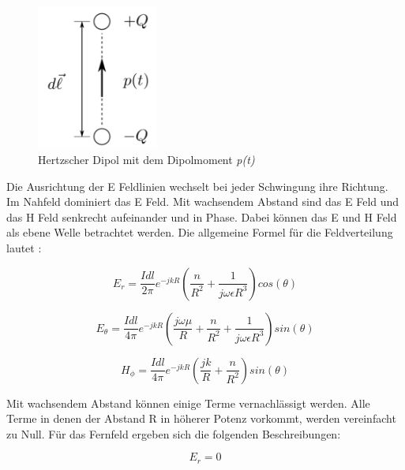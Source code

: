 \begin{figure}[!htb]
	\centering
	\includegraphics[width=4cm]{content/bilder/HerzDipolEMANTS37.pdf}%
	\caption{Hertzscher Dipol mit dem Dipolmoment \textit{p(t)} \cite{Emant}}
	\label{HerzDipol}
\end{figure}

Die Ausrichtung der E Feldlinien wechselt bei jeder Schwingung ihre Richtung. Im Nahfeld dominiert das E Feld. Mit wachsendem Abstand sind das E Feld und das H Feld senkrecht aufeinander und in Phase. Dabei können das E und H Feld als ebene Welle betrachtet werden. Die allgemeine Formel für die Feldverteilung lautet \cite{elliott1981antenna}:



\begin{equation}
E_r= \frac{I dl}{2\pi}   e^{-jkR} \left( \frac{n}{R^{2}}  + \frac{1}{j\omega \epsilon R^{3}}\right) cos(\theta)
\end{equation}

\begin{equation}
E_\theta= \frac{I dl}{4\pi}   e^{-jkR} \left( \frac{j\omega \mu}{R}  + \frac{n}{R^{2}}+ \frac{1}{j\omega \epsilon R^{3}}\right) sin(\theta)
\end{equation}

\begin{equation}
H_\phi= \frac{I dl}{4\pi}   e^{-jkR} \left( \frac{jk}{R}  + \frac{n}{R^{2}}\right) sin(\theta)
\end{equation}

Mit wachsendem Abstand können einige Terme vernachlässigt werden. Alle Terme in denen der Abstand R in höherer Potenz vorkommt, werden vereinfacht zu Null. Für das Fernfeld ergeben sich die folgenden Beschreibungen:


\begin{equation}
E_r= 0
\end{equation}

